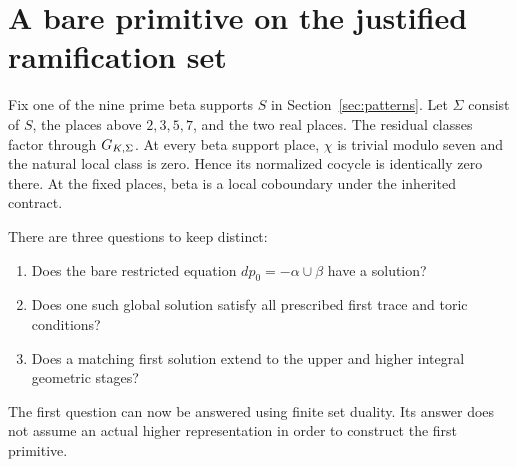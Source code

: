 \section{A bare primitive on the justified ramification set}\label{sec:bareprimitive}
Fix one of the nine prime beta supports $S$ in Section~\ref{sec:patterns}. Let $\Sigma$ consist of $S$, the places above $2,3,5,7$, and the two real places. The residual classes factor through $G_{K,\Sigma}$. At every beta support place, $\chi$ is trivial modulo seven and the natural local class is zero. Hence its normalized cocycle is identically zero there. At the fixed places, beta is a local coboundary under the inherited contract.

There are three questions to keep distinct:
\begin{enumerate}
\item Does the bare restricted equation $dp_0=-\alpha\cup\beta$ have a solution?
\item Does one such global solution satisfy all prescribed first trace and toric conditions?
\item Does a matching first solution extend to the upper and higher integral geometric stages?
\end{enumerate}
The first question can now be answered using finite set duality. Its answer does not assume an actual higher representation in order to construct the first primitive.

